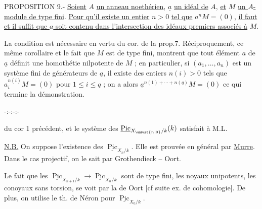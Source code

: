 PROPOSITION 9.- \uline{Soient} $A$ \uline{un anneau noethérien}, $\underline a$ \uline{un idéal de} $A$, \uline{et} $M$ \uline{un $A$-module de type fini}. \uline{Pour qu'il existe un entier} $n>0$ \uline{tel que} $a^nM=(0)$, \uline{il faut et il suffit que $a$ soit contenu dans l'intersection des idéaux premiers associés à} $M$.

La condition est nécessaire en vertu du cor. de la prop.7. Réciproquement, ce même corollaire et le fait que $M$ est de type fini, montrent que tout élément $a$ de $\underline a$ définit une homothétie nilpotente de $M$ ; en particulier, si $(a_1,\ldots,a_n)$ est un système fini de générateurs de $\underline a$, il existe des entiers $n(i)>0$ tels que $a_i^{n(i)}M=(0)$ pour $1\leq i\leq q$ ; on a alors $\underline a^{n(1)+\cdots+n(q)}M=(0)$ ce qui termine la démonstration.

\begin{center}-:-:-:-\end{center}



du cor 1 précédent, et le système des $\underline{\operatorname{Pic}}_{X_{\unsure{n|0}}/k}(k)$ satisfait à M.L.


\uline{N.B.} On suppose l'existence des $\underline{\operatorname{Pic}}_{X_n/k}$. Elle est prouvée en général par \uline{Murre}. Dans le cas projectif, on le sait par Grothendieck -- Oort.

Le fait que les $\underline{\operatorname{Pic}}_{X_{n+1}/k}\longrightarrow\underline{\operatorname{Pic}}_{X_n/k}$ sont de type fini,  les noyaux  unipotents, les conoyaux sans torsion, se voit par la  de Oort   [cf suite ex. de cohomologie]. De plus, on utilise le th.  de Néron  pour $\underline{\operatorname{Pic}}_{X_0/k}$.


